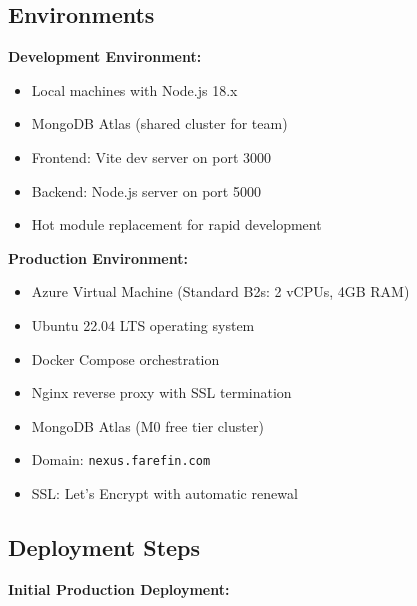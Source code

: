 \documentclass[12pt,a4paper]{article}
\begin{document}
\subsection{Environments}

\textbf{Development Environment:}
\begin{itemize}[noitemsep]
  \item Local machines with Node.js 18.x
  \item MongoDB Atlas (shared cluster for team)
  \item Frontend: Vite dev server on port 3000
  \item Backend: Node.js server on port 5000
  \item Hot module replacement for rapid development
\end{itemize}

\textbf{Production Environment:}
\begin{itemize}[noitemsep]
  \item Azure Virtual Machine (Standard B2s: 2 vCPUs, 4GB RAM)
  \item Ubuntu 22.04 LTS operating system
  \item Docker Compose orchestration
  \item Nginx reverse proxy with SSL termination
  \item MongoDB Atlas (M0 free tier cluster)
  \item Domain: \texttt{nexus.farefin.com}
  \item SSL: Let's Encrypt with automatic renewal
\end{itemize}

\subsection{Deployment Steps}

\textbf{Initial Production Deployment:}
\end{document}
